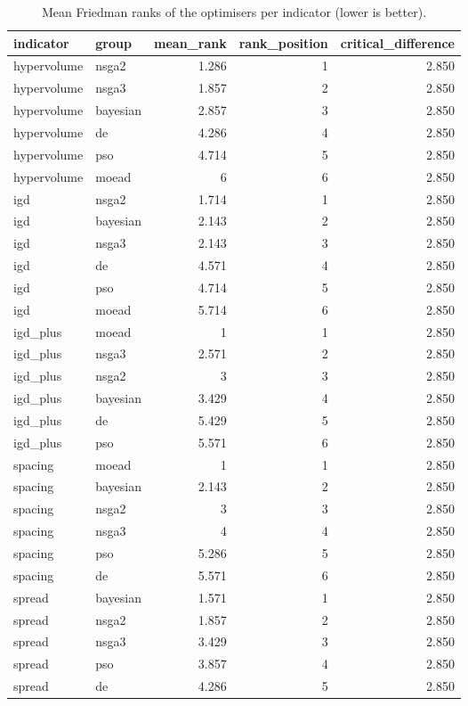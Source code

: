 \begin{table}[!t]
\centering
\caption{Mean Friedman ranks of the optimisers per indicator (lower is better).}
\label{tab:statistics_optimizer_ranks_main}
\footnotesize
\begin{tabular}{llrrr}
\toprule
indicator & group & mean\_rank & rank\_position & critical\_difference \\
\midrule
hypervolume & nsga2 & 1.286 & 1 & 2.850 \\
hypervolume & nsga3 & 1.857 & 2 & 2.850 \\
hypervolume & bayesian & 2.857 & 3 & 2.850 \\
hypervolume & de & 4.286 & 4 & 2.850 \\
hypervolume & pso & 4.714 & 5 & 2.850 \\
hypervolume & moead & 6 & 6 & 2.850 \\
igd & nsga2 & 1.714 & 1 & 2.850 \\
igd & bayesian & 2.143 & 2 & 2.850 \\
igd & nsga3 & 2.143 & 3 & 2.850 \\
igd & de & 4.571 & 4 & 2.850 \\
igd & pso & 4.714 & 5 & 2.850 \\
igd & moead & 5.714 & 6 & 2.850 \\
igd\_plus & moead & 1 & 1 & 2.850 \\
igd\_plus & nsga3 & 2.571 & 2 & 2.850 \\
igd\_plus & nsga2 & 3 & 3 & 2.850 \\
igd\_plus & bayesian & 3.429 & 4 & 2.850 \\
igd\_plus & de & 5.429 & 5 & 2.850 \\
igd\_plus & pso & 5.571 & 6 & 2.850 \\
spacing & moead & 1 & 1 & 2.850 \\
spacing & bayesian & 2.143 & 2 & 2.850 \\
spacing & nsga2 & 3 & 3 & 2.850 \\
spacing & nsga3 & 4 & 4 & 2.850 \\
spacing & pso & 5.286 & 5 & 2.850 \\
spacing & de & 5.571 & 6 & 2.850 \\
spread & bayesian & 1.571 & 1 & 2.850 \\
spread & nsga2 & 1.857 & 2 & 2.850 \\
spread & nsga3 & 3.429 & 3 & 2.850 \\
spread & pso & 3.857 & 4 & 2.850 \\
spread & de & 4.286 & 5 & 2.850 \\

\end{tabular}
\end{table}
